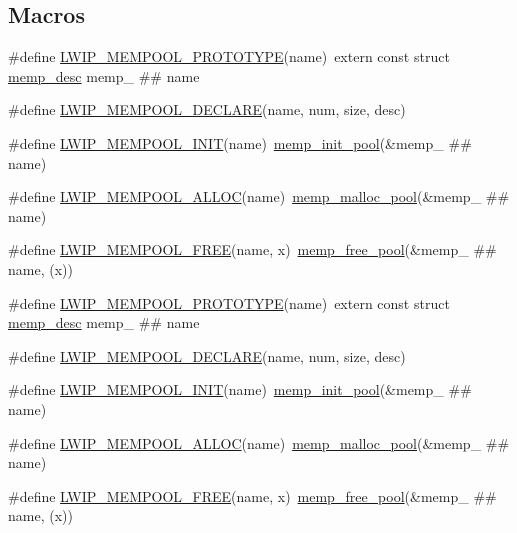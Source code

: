 \subsection*{Macros}
\begin{DoxyCompactItemize}
\item 
\#define \hyperlink{group__mempool_ga92fc8c29d0e2654f2a2ecc43b2b7fb13}{L\+W\+I\+P\+\_\+\+M\+E\+M\+P\+O\+O\+L\+\_\+\+P\+R\+O\+T\+O\+T\+Y\+PE}(name)~extern const struct \hyperlink{structmemp__desc}{memp\+\_\+desc} memp\+\_\+ \#\# name
\item 
\#define \hyperlink{group__mempool_ga5b1fb3ce7942432d87cc948b1c5ed6cb}{L\+W\+I\+P\+\_\+\+M\+E\+M\+P\+O\+O\+L\+\_\+\+D\+E\+C\+L\+A\+RE}(name,  num,  size,  desc)
\item 
\#define \hyperlink{group__mempool_ga60b51c06d276f525b35d8b7abd4dcb41}{L\+W\+I\+P\+\_\+\+M\+E\+M\+P\+O\+O\+L\+\_\+\+I\+N\+IT}(name)~\hyperlink{openmote-cc2538_2lwip_2src_2include_2lwip_2priv_2memp__priv_8h_a6416303426d05526bed33f241fa6ecd7}{memp\+\_\+init\+\_\+pool}(\&memp\+\_\+ \#\# name)
\item 
\#define \hyperlink{group__mempool_ga5e2498f6c17746c1fe7153de5f7f275a}{L\+W\+I\+P\+\_\+\+M\+E\+M\+P\+O\+O\+L\+\_\+\+A\+L\+L\+OC}(name)~\hyperlink{openmote-cc2538_2lwip_2src_2include_2lwip_2priv_2memp__priv_8h_a348c83ee972f1edf7296a1cdf1d75f22}{memp\+\_\+malloc\+\_\+pool}(\&memp\+\_\+ \#\# name)
\item 
\#define \hyperlink{group__mempool_gaa43d114dd702fbd8f1db18474ea93a04}{L\+W\+I\+P\+\_\+\+M\+E\+M\+P\+O\+O\+L\+\_\+\+F\+R\+EE}(name,  x)~\hyperlink{openmote-cc2538_2lwip_2src_2include_2lwip_2priv_2memp__priv_8h_a62f8c3c907743e34eee3cdac7fa1eaa5}{memp\+\_\+free\+\_\+pool}(\&memp\+\_\+ \#\# name, (x))
\item 
\#define \hyperlink{group__mempool_ga92fc8c29d0e2654f2a2ecc43b2b7fb13}{L\+W\+I\+P\+\_\+\+M\+E\+M\+P\+O\+O\+L\+\_\+\+P\+R\+O\+T\+O\+T\+Y\+PE}(name)~extern const struct \hyperlink{structmemp__desc}{memp\+\_\+desc} memp\+\_\+ \#\# name
\item 
\#define \hyperlink{group__mempool_ga5b1fb3ce7942432d87cc948b1c5ed6cb}{L\+W\+I\+P\+\_\+\+M\+E\+M\+P\+O\+O\+L\+\_\+\+D\+E\+C\+L\+A\+RE}(name,  num,  size,  desc)
\item 
\#define \hyperlink{group__mempool_ga60b51c06d276f525b35d8b7abd4dcb41}{L\+W\+I\+P\+\_\+\+M\+E\+M\+P\+O\+O\+L\+\_\+\+I\+N\+IT}(name)~\hyperlink{openmote-cc2538_2lwip_2src_2include_2lwip_2priv_2memp__priv_8h_a6416303426d05526bed33f241fa6ecd7}{memp\+\_\+init\+\_\+pool}(\&memp\+\_\+ \#\# name)
\item 
\#define \hyperlink{group__mempool_ga5e2498f6c17746c1fe7153de5f7f275a}{L\+W\+I\+P\+\_\+\+M\+E\+M\+P\+O\+O\+L\+\_\+\+A\+L\+L\+OC}(name)~\hyperlink{openmote-cc2538_2lwip_2src_2include_2lwip_2priv_2memp__priv_8h_a348c83ee972f1edf7296a1cdf1d75f22}{memp\+\_\+malloc\+\_\+pool}(\&memp\+\_\+ \#\# name)
\item 
\#define \hyperlink{group__mempool_gaa43d114dd702fbd8f1db18474ea93a04}{L\+W\+I\+P\+\_\+\+M\+E\+M\+P\+O\+O\+L\+\_\+\+F\+R\+EE}(name,  x)~\hyperlink{openmote-cc2538_2lwip_2src_2include_2lwip_2priv_2memp__priv_8h_a62f8c3c907743e34eee3cdac7fa1eaa5}{memp\+\_\+free\+\_\+pool}(\&memp\+\_\+ \#\# name, (x))
\end{DoxyCompactItemize}


